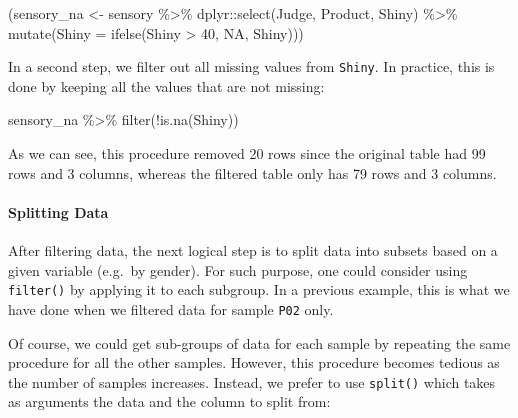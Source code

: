 \documentclass[
]{book}
\newenvironment{Shaded}{\begin{snugshade}}{\end{snugshade}}
\newcommand{\AttributeTok}[1]{\textcolor[rgb]{0.77,0.63,0.00}{#1}}
\newcommand{\CommentTok}[1]{\textcolor[rgb]{0.56,0.35,0.01}{\textit{#1}}}
\newcommand{\ConstantTok}[1]{\textcolor[rgb]{0.00,0.00,0.00}{#1}}
\newcommand{\DecValTok}[1]{\textcolor[rgb]{0.00,0.00,0.81}{#1}}
\newcommand{\FunctionTok}[1]{\textcolor[rgb]{0.00,0.00,0.00}{#1}}
\newcommand{\NormalTok}[1]{#1}
\newcommand{\OtherTok}[1]{\textcolor[rgb]{0.56,0.35,0.01}{#1}}
\newcommand{\SpecialCharTok}[1]{\textcolor[rgb]{0.00,0.00,0.00}{#1}}
\begin{document}
\begin{Shaded}
\begin{Highlighting}[]
\NormalTok{(sensory\_na }\OtherTok{\textless{}{-}}\NormalTok{ sensory }\SpecialCharTok{\%\textgreater{}\%} 
\NormalTok{  dplyr}\SpecialCharTok{::}\FunctionTok{select}\NormalTok{(Judge, Product, Shiny) }\SpecialCharTok{\%\textgreater{}\%} 
  \FunctionTok{mutate}\NormalTok{(}\AttributeTok{Shiny =} \FunctionTok{ifelse}\NormalTok{(Shiny }\SpecialCharTok{\textgreater{}} \DecValTok{40}\NormalTok{, }\ConstantTok{NA}\NormalTok{, Shiny)))}
\end{Highlighting}
\end{Shaded}

In a second step, we filter out all missing values from \texttt{Shiny}. In practice, this is done by keeping all the values that are not missing:

\begin{Shaded}
\begin{Highlighting}[]
\NormalTok{sensory\_na }\SpecialCharTok{\%\textgreater{}\%} 
  \FunctionTok{filter}\NormalTok{(}\SpecialCharTok{!}\FunctionTok{is.na}\NormalTok{(Shiny))}
\end{Highlighting}
\end{Shaded}

As we can see, this procedure removed 20 rows since the original table had 99 rows and 3 columns, whereas the filtered table only has 79 rows and 3 columns.

\hypertarget{splitting-data}{%
\paragraph{Splitting Data}\label{splitting-data}}

After filtering data, the next logical step is to split data into subsets based on a given variable (e.g.~by gender). For such purpose, one could consider using \texttt{filter()} by applying it to each subgroup. In a previous example, this is what we have done when we filtered data for sample \texttt{P02} only.

Of course, we could get sub-groups of data for each sample by repeating the same procedure for all the other samples. However, this procedure becomes tedious as the number of samples increases. Instead, we prefer to use \texttt{split()} which takes as arguments the data and the column to split from:

\begin{Shaded}
\end{Shaded}
\end{document}
